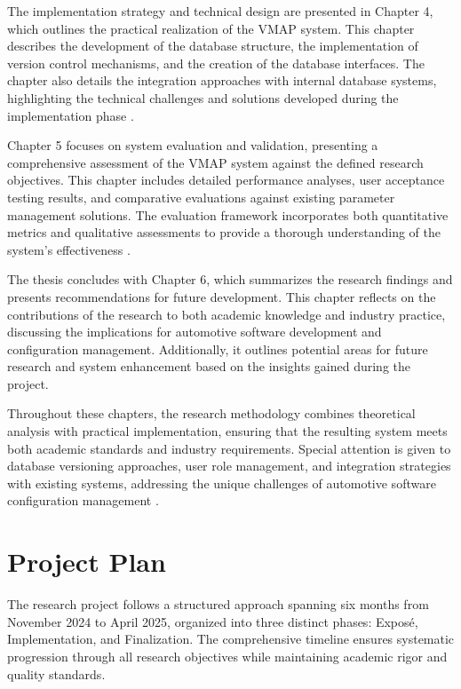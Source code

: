 The implementation strategy and technical design are presented in Chapter 4, which outlines the practical realization of the VMAP system. This chapter describes the development of the database structure, the implementation of version control mechanisms, and the creation of the database interfaces. The chapter also details the integration approaches with internal database systems, highlighting the technical challenges and solutions developed during the implementation phase \cite{broy2006challenges}.

Chapter 5 focuses on system evaluation and validation, presenting a comprehensive assessment of the VMAP system against the defined research objectives. This chapter includes detailed performance analyses, user acceptance testing results, and comparative evaluations against existing parameter management solutions. The evaluation framework incorporates both quantitative metrics and qualitative assessments to provide a thorough understanding of the system's effectiveness \cite{elmasri2015fundamentals}.

The thesis concludes with Chapter 6, which summarizes the research findings and presents recommendations for future development. This chapter reflects on the contributions of the research to both academic knowledge and industry practice, discussing the implications for automotive software development and configuration management. Additionally, it outlines potential areas for future research and system enhancement based on the insights gained during the project.

Throughout these chapters, the research methodology combines theoretical analysis with practical implementation, ensuring that the resulting system meets both academic standards and industry requirements. Special attention is given to database versioning approaches, user role management, and integration strategies with existing systems, addressing the unique challenges of automotive software configuration management \cite{staron2021automotive}.


\section{Project Plan}

The research project follows a structured approach spanning six months from November 2024 to April 2025, organized into three distinct phases: Exposé, Implementation, and Finalization. The comprehensive timeline ensures systematic progression through all research objectives while maintaining academic rigor and quality standards.

